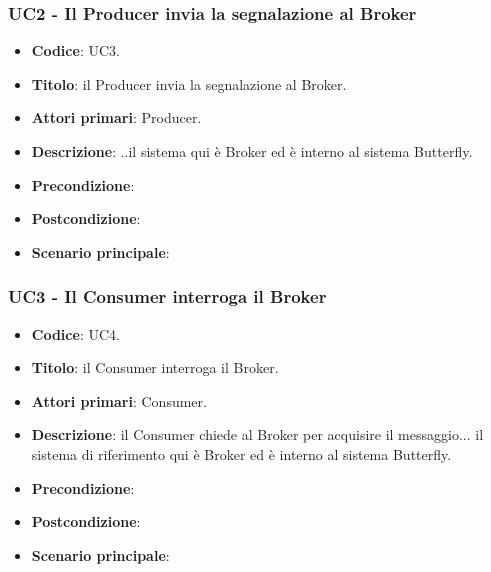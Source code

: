 \subsubsection{UC2 - Il Producer invia la segnalazione al Broker}
	\begin{itemize}
		\item \textbf{Codice}: UC3.
		\item \textbf{Titolo}: il Producer invia la segnalazione al Broker.
		\item \textbf{Attori primari}: Producer.
		\item \textbf{Descrizione}: ..il sistema qui è Broker ed è interno al sistema Butterfly.
		\item \textbf{Precondizione}:
		\item \textbf{Postcondizione}:
		\item \textbf{Scenario principale}: 
	\end{itemize}


\subsubsection{UC3 - Il Consumer interroga il Broker}
	\begin{itemize}
		\item \textbf{Codice}: UC4.
		\item \textbf{Titolo}: il Consumer interroga il Broker.
		\item \textbf{Attori primari}: Consumer.
		\item \textbf{Descrizione}: il Consumer chiede al Broker per acquisire il messaggio... il sistema di riferimento qui è Broker ed è interno al sistema Butterfly.
		\item \textbf{Precondizione}:
		\item \textbf{Postcondizione}:
		\item \textbf{Scenario principale}: 
	\end{itemize}


